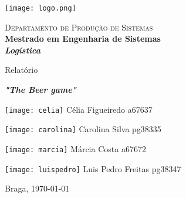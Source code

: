 \begin{titlepage}


\begin{minipage}{0.3\textwidth}
\begin{flushleft} 
\texttt{[image: logo.png]}
\end{flushleft}
\end{minipage}
\begin{minipage}{0.6\textwidth}
\begin{flushright} 

\textsc{Departamento de Produção de Sistemas}\\[0.1cm]
\bfseries Mestrado em Engenharia de Sistemas\\ [0.1cm]
\bfseries \textit{Logística}\\[8mm]

\end{flushright}
\end{minipage}


\vspace{3cm}


\begin{center}


\LARGE Relatório

\vspace{1cm}
\huge \textbf{\textit{"The Beer game"}}\\[1.5cm]


\noindent\begin{minipage}[b]{.2\textwidth}
	\texttt{[image: celia]}
	\small{Célia Figueiredo a67637}
\end{minipage} 
\hfill
\begin{minipage}[b]{.2\textwidth}
	\texttt{[image: carolina]}
	\small{Carolina Silva  pg38335}
\end{minipage}
\hfill
\begin{minipage}[b]{.2\textwidth}
	\texttt{[image: marcia]}
	\small{Márcia Costa a67672}
\end{minipage}
\hfill
\begin{minipage}[b]{.2\textwidth}
	\texttt{[image: luispedro]}
	\small{Luis Pedro Freitas pg38347}
\end{minipage}




\vspace{3ex}


\vfill

\large Braga, {\large \today}

\end{center}
\end{titlepage}
